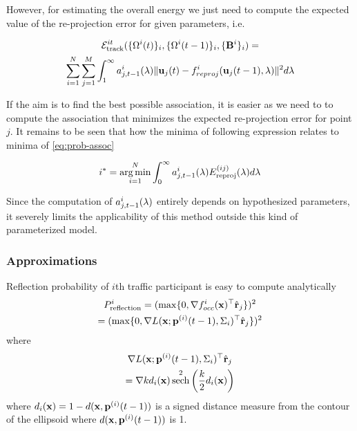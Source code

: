 \documentclass[10pt,twocolumn,letterpaper]{article}
\DeclareMathOperator{\sech}{sech}
\DeclareMathOperator*{\argmin}{\arg\min}
\begin{document}
However, for estimating the overall energy we just need to compute the expected
value of the re-projection error for given parameters, i.e.

\begin{multline}
  \mathcal{E}^{it}_{\text{track}}(\{ \Omega^{i}(t) \}_i, \{ \Omega^{i}(t-1) \}_i,\{ \mathbf{B}^{i} \}_i) = \\
    \sum_{i = 1}^N
    \sum_{j = 1}^{M}
    \int_1^{\infty}
    a^i_{j,t-1}(\lambda) 
    \|\mathbf{u}_j(t) - f^i_{reproj}(\mathbf{u}_j(t-1), \lambda)\|^2
    d\lambda
\end{multline}

If the aim is to find the best possible association, it is easier as we need to
to compute the association that minimizes the expected re-projection error for
point $j$. It remains to be seen that how the minima of following expression relates to minima of \eqref{eq:prob-assoc}

\begin{align}
  i^* = \argmin_{i=1}^N \int_0^\infty \assocP \Ereproj(\lambda) d\lambda
\end{align}

Since the computation of $a^{i}_{j,t-1}(\lambda)$ entirely depends on hypothesized parameters,
it severely limits the applicability of this method outside this kind of
parameterized model.

\subsubsection{Approximations}
\newcommand{\Ptrans}{P_{\text{transmission}}}
\newcommand{\Prefl}{P^i_{\text{reflection}}}
\newcommand{\dishort}{d_i(\mathbf{x})}

Reflection probability of $i$th traffic participant is easy to compute
analytically 
\begin{multline}
  \Prefl =
  (\max \{ 0, \nabla \occf^\top \ray \})^2 \\
  = (\max \{ 0, \nabla \occfxi^\top\ray \})^2
  \label{eq:analytic-prefl}
\end{multline}
where 
\begin{multline}
  \nabla \occfxi^\top\ray \\=
  \nabla k\dishort \sech^2\left(\frac{k}{2}\dishort\right)
\end{multline}
where $\dishort = 1-d(\mathbf{x}, \pos{i}{t-1})$ is a signed distance measure
from the contour of the ellipsoid where $d(\mathbf{x}, \mathbf{p}^{(i)}(t-1))$ is 1.
\end{document}
